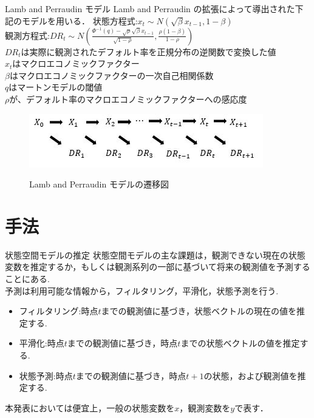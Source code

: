 \documentclass[dvipdfmx]{beamer}
\begin{document}
\begin{frame}{Lamb and Perraudin モデル}
Lamb and Perraudin の拡張によって導出された下記のモデルを用いる．
状態方程式:$x_t\sim N\left(\sqrt{\beta}x_{t-1} , 1-\beta\right)$\\
観測方程式:$DR_t\sim N\left( \frac{\Phi^{-1}(q)-\sqrt{\rho}\sqrt{\beta}x_{t-1}}{\sqrt{1-\rho}}, \frac{\rho(1 - \beta)}{1 - \rho}\right)$\\ $DR_t$は実際に観測されたデフォルト率を正規分布の逆関数で変換した値\\
$x_t$はマクロエコノミックファクター\\
$\beta$はマクロエコノミックファクターの一次自己相関係数\\
$q$はマートンモデルの閾値\\
$\rho$が、デフォルト率のマクロエコノミックファクターへの感応度
\begin{figure}[h]
\begin{center}
  \includegraphics[scale=0.8]{figure/state_space_lamb_and_perraudin.jpg} \\
\caption{Lamb and Perraudin モデルの遷移図}
\label{fig:Lamb and Perraudin モデルの遷移図}
\end{center}
\end{figure}
\end{frame}

\section{手法}

\begin{frame}{状態空間モデルの推定}
状態空間モデルの主な課題は，観測できない現在の状態変数を推定するか，もしくは観測系列の一部に基づいて将来の観測値を予測することにある.\\
予測は利用可能な情報から，フィルタリング，平滑化，状態予測を行う. 
\begin{itemize}
 \item フィルタリング:時点$t$までの観測値に基づき，状態ベクトルの現在の値を推定する.
 \item 平滑化:時点$t$までの観測値に基づき，時点$t$までの状態ベクトルの値を推定する.
 \item 状態予測:時点$t$までの観測値に基づき，時点$t+1$の状態，および観測値を推定する.
\end{itemize}
本発表においては便宜上，一般の状態変数を$x$，観測変数を$y$で表す．
\end{frame}
\end{document}
